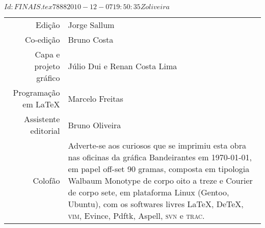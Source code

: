 \SVN $Id: FINAIS.tex 7888 2010-12-07 19:50:35Z oliveira $


\newcommand{\putline}[2]{#1 & #2\\}

%
\ifodd\thepage\paginabranca\else\clearpage\fi
\pagebreak

\noindent\begin{tabular}{rp{}}
\small
\putline{Edição}{Jorge Sallum}
		\putline{Co-edição}{Bruno Costa}
		\putline{Capa e projeto gráfico}{Júlio Dui e Renan Costa Lima}
		\putline{Programação em LaTeX}{Marcelo Freitas}
		\putline{Assistente editorial}{Bruno Oliveira}
		\putline{Colofão}{Adverte-se aos curiosos que se
			imprimiu esta obra nas oficinas da gráfica
			Bandeirantes em \today, em papel 
			\mbox{off-set} 90 gramas,
			composta em tipologia Walbaum Monotype de 
			corpo oito a treze e Courier de corpo sete, 
			em plataforma Linux (Gentoo, Ubuntu), 
			com os softwares livres 
			\LaTeX, De\TeX, \textsc{vim}, Evince, Pdftk, 
			Aspell, \textsc{svn} e \textsc{trac}.}
\end{tabular}

